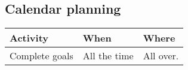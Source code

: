 \subsection{Calendar planning}

\begin{table}
    \centering
    \begin{tabular}{l|l|l}
        \rowcolor{Gray}
        \textbf{Activity} & \textbf{When} & \textbf{Where}\\\hline
         Complete goals   & All the time  & All over.
    \end{tabular}
    \label{tab:planning}
\end{table}
